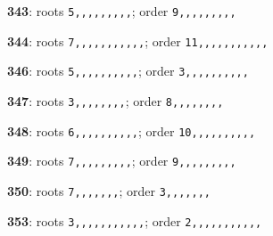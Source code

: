 \noindent \textbf{343}: roots \texttt{5,,,,,,,,,}; order \texttt{9,,,,,,,,,}\par
\noindent \textbf{344}: roots \texttt{7,,,,,,,,,,,}; order \texttt{11,,,,,,,,,,,}\par
\noindent \textbf{346}: roots \texttt{5,,,,,,,,,,}; order \texttt{3,,,,,,,,,,}\par
\noindent \textbf{347}: roots \texttt{3,,,,,,,,}; order \texttt{8,,,,,,,,}\par
\noindent \textbf{348}: roots \texttt{6,,,,,,,,,,}; order \texttt{10,,,,,,,,,,}\par
\noindent \textbf{349}: roots \texttt{7,,,,,,,,,}; order \texttt{9,,,,,,,,,}\par
\noindent \textbf{350}: roots \texttt{7,,,,,,,}; order \texttt{3,,,,,,,}\par
\noindent \textbf{353}: roots \texttt{3,,,,,,,,,,,}; order \texttt{2,,,,,,,,,,,}\par
